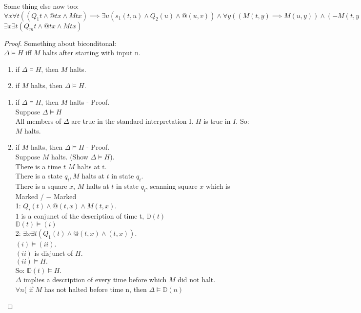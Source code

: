 Some thing else now too:\\
$\forall x \forall t ((Q_1 t \wedge @tx \wedge Mtx ) \implies \exists u ( s_1 (t , u) \wedge Q_2(u) \wedge @ (u,v)) \wedge \forall y ((M(t,y) \implies M(u,y)) \wedge (-M(t,y) \implies - M(u,y)))))$ \\
$\exists x \exists t ( Q_mt \wedge @tx \wedge Mtx)$\\


\begin{proof}
Something about biconditonal:\\
$\Delta \vDash H$ iff $M$ halts after starting with input n.
\begin{enumerate}
\item if $\Delta \vDash H$, then $M$ halts.
\item if $M$ halts, then $\Delta \vDash H$.
\end{enumerate}
\begin{enumerate}
\item if $\Delta \vDash H$, then $M$ halts - Proof. \\
Suppose $\Delta \vDash H$ \\
All members of $\Delta$ are true in the standard interpretation I.
$H$ is true in $I$.
So: $M$ halts.
\item if $M$ halts, then $\Delta \vDash H$ - Proof. \\
Suppose $M$ halts. (Show $\Delta \vDash H$). \\
There is a time \underline{$t$} $M$ halts at t. \\
There is a state $q_i, M$ halts at $t$ in state $q_i$. \\
There is a square $x$, $M$ halts at $t$ in state $q_i$, scanning square $x$ which is Marked / $-$ Marked \\
1: $Q_i(t) \wedge @(t,x) \wedge M(t,x)$. \\
1 is a conjunct of the description of time t, $\mathbb{D}(t)$ \\
$\mathbb{D}(t) \vDash (i)$ \\

2: $\exists x \exists t (Q_1(t) \wedge @ (t,x) \wedge (t,x))$. \\

$(i) \vDash (ii)$. \\
$(ii)$ is disjunct of $H$. \\
$(ii) \vDash H.$ \\
So: $\mathbb{D}(t) \vDash H$. \\


$\Delta$ implies a description of every time before which $M$ did not halt. \\
$\forall n$( if $M$ has not halted before time n, then $\Delta \vDash \mathbb{D}(n)$ \\
\end{enumerate}
\end{proof}


